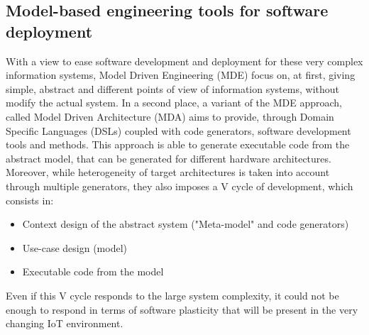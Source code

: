 


\subsection{Model-based engineering tools for software deployment}
With a view to ease software development and deployment for these very complex information systems, Model Driven Engineering (MDE) focus on, at first, giving simple, abstract and different points of view of information systems, without modify the actual system. 
In a second place, a variant of the MDE approach, called Model Driven Architecture (MDA)\cite{kleppe2003mda} aims to provide, through Domain Specific Languages (DSLs) coupled with code generators, software development tools and methods.
This approach is able to generate executable code from the abstract model, that can be generated for different hardware architectures.
Moreover, while heterogeneity of target architectures is taken into account through multiple generators, they also imposes a V cycle of development\cite{fouquet2013kevoree}, which consists in:
\begin{itemize}
	\item Context design of the abstract system ("Meta-model" and code generators)
	\item Use-case design (model)
	\item Executable code from the model
\end{itemize}
Even if this V cycle responds to the large system complexity, it could not be enough to respond in terms of software plasticity that will be present in the very changing IoT environment.

